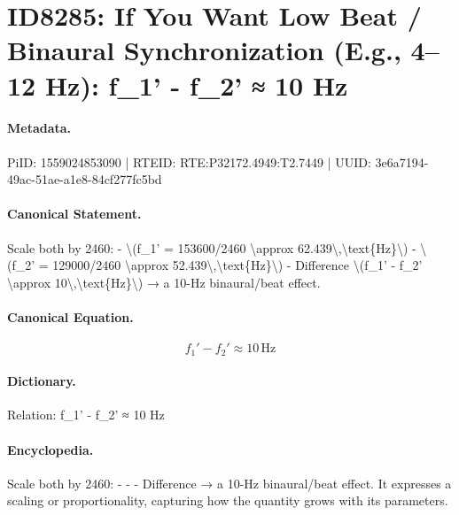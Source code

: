 \section*{ID8285: If You Want Low Beat / Binaural Synchronization (E.g., 4–12 Hz): f\_1' - f\_2' ≈ 10 Hz}
\paragraph{Metadata.}
PiID: 1559024853090 | RTEID: RTE:P32172.4949:T2.7449 | UUID: 3e6a7194-49ac-51ae-a1e8-84cf277fc5bd

\paragraph{Canonical Statement.}
Scale both by 2460: - \textbackslash{}(f\_1' = 153600/2460 \textbackslash{}approx 62.439\textbackslash{},\textbackslash{}text\{Hz\}\textbackslash{}) - \textbackslash{}(f\_2' = 129000/2460 \textbackslash{}approx 52.439\textbackslash{},\textbackslash{}text\{Hz\}\textbackslash{}) - Difference \textbackslash{}(f\_1' - f\_2' \textbackslash{}approx 10\textbackslash{},\textbackslash{}text\{Hz\}\textbackslash{}) → a 10-Hz binaural/beat effect.

\paragraph{Canonical Equation.}
\[
f_1' - f_2' \approx 10\,\text{Hz}
\]

\paragraph{Dictionary.}
Relation: f\_1' - f\_2' ≈ 10 Hz

\paragraph{Encyclopedia.}
Scale both by 2460: - - - Difference → a 10-Hz binaural/beat effect. It expresses a scaling or proportionality, capturing how the quantity grows with its parameters.
